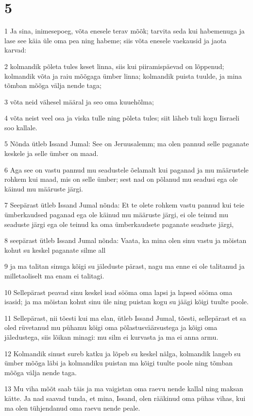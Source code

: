 \chapter{5}

\par 1 Ja sina, inimesepoeg, võta enesele terav mõõk; tarvita seda kui habemenuga ja lase see käia üle oma pea ning habeme; siis võta enesele vaekausid ja jaota karvad:
\par 2 kolmandik põleta tules keset linna, siis kui piiramispäevad on lõppenud; kolmandik võta ja raiu mõõgaga ümber linna; kolmandik puista tuulde, ja mina tõmban mõõga välja nende taga;
\par 3 võta neid vähesel määral ja seo oma kuuehõlma;
\par 4 võta neist veel osa ja viska tulle ning põleta tules; siit läheb tuli kogu Iisraeli soo kallale.
\par 5 Nõnda ütleb Issand Jumal: See on Jeruusalemm; ma olen pannud selle paganate keskele ja selle ümber on maad.
\par 6 Aga see on vastu pannud mu seadustele õelamalt kui paganad ja mu määrustele rohkem kui maad, mis on selle ümber; sest nad on põlanud mu seadusi ega ole käinud mu määruste järgi.
\par 7 Seepärast ütleb Issand Jumal nõnda: Et te olete rohkem vastu pannud kui teie ümberkaudsed paganad ega ole käinud mu määruste järgi, ei ole teinud mu seaduste järgi ega ole teinud ka oma ümberkaudsete paganate seaduste järgi,
\par 8 seepärast ütleb Issand Jumal nõnda: Vaata, ka mina olen sinu vastu ja mõistan kohut su keskel paganate silme all
\par 9 ja ma talitan sinuga kõigi su jäleduste pärast, nagu ma enne ei ole talitanud ja milletaoliselt ma enam ei talitagi.
\par 10 Sellepärast peavad sinu keskel isad sööma oma lapsi ja lapsed sööma oma isasid; ja ma mõistan kohut sinu üle ning puistan kogu su jäägi kõigi tuulte poole.
\par 11 Sellepärast, nii tõesti kui ma elan, ütleb Issand Jumal, tõesti, sellepärast et sa oled rüvetanud mu pühamu kõigi oma põlastusväärsustega ja kõigi oma jäledustega, siis lõikan minagi: mu silm ei kurvasta ja ma ei anna armu.
\par 12 Kolmandik sinust sureb katku ja lõpeb su keskel nälga, kolmandik langeb su ümber mõõga läbi ja kolmandiku puistan ma kõigi tuulte poole ning tõmban mõõga välja nende taga.
\par 13 Mu viha mõõt saab täis ja ma vaigistan oma raevu nende kallal ning maksan kätte. Ja nad saavad tunda, et mina, Issand, olen rääkinud oma pühas vihas, kui ma olen tühjendanud oma raevu nende peale.

